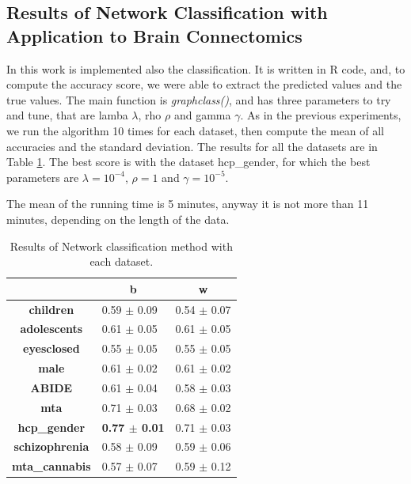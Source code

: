 \subsection{Results of Network Classification with Application to Brain Connectomics}

In this work is implemented also the classification. It is written in R code, and, to compute the accuracy score, we were able to extract the predicted values and the true values. The main function is \textit{graphclass()}, and has three parameters to try and tune, that are lamba $\lambda$, rho $\rho$ and gamma $\gamma$. As in the previous experiments, we run the algorithm 10 times for each dataset, then compute the mean of all accuracies and the standard deviation. The results for all the datasets are in Table \ref{tab:graphclass}. The best score is with the dataset hcp\_gender, for which the best parameters are $\lambda = 10^{-4} $, $\rho = 1$ and $\gamma = 10^{-5}$. 
\vspace{0.5cm}

The mean of the running time is 5 minutes, anyway it is not more than 11 minutes, depending on the length of the data. 

\begin{table}
	\centering
	\begin{tabular}{c|l|c} 
		\toprule
		& \multicolumn{1}{c|}{b} & w                \\ 
		\midrule
		\textbf{children}      & 0.59 $\pm$ 0.09        & 0.54 $\pm$ 0.07  \\
		\textbf{adolescents}   & 0.61 $\pm$ 0.05        & 0.61 $\pm$ 0.05  \\
		\textbf{eyesclosed}    & 0.55 $\pm$ 0.05        & 0.55 $\pm$ 0.05  \\
		\textbf{male}          & 0.61 $\pm$ 0.02        & 0.61 $\pm$ 0.02  \\
		\textbf{ABIDE}         & 0.61 $\pm$ 0.04        & 0.58 $\pm$ 0.03  \\
		\textbf{mta}           & 0.71 $\pm$ 0.03        & 0.68 $\pm$ 0.02  \\
		\textbf{hcp\_gender}   & \textbf{0.77 $\pm$ 0.01}        & 0.71 $\pm$ 0.03  \\
		\textbf{schizophrenia} & 0.58 $\pm$ 0.09        & 0.59 $\pm$ 0.06  \\
		\textbf{mta\_cannabis} & 0.57 $\pm$ 0.07        & 0.59 $\pm$ 0.12 
	\end{tabular}
\caption{Results of Network classification method with each dataset.}
\label{tab:graphclass}
\end{table}

